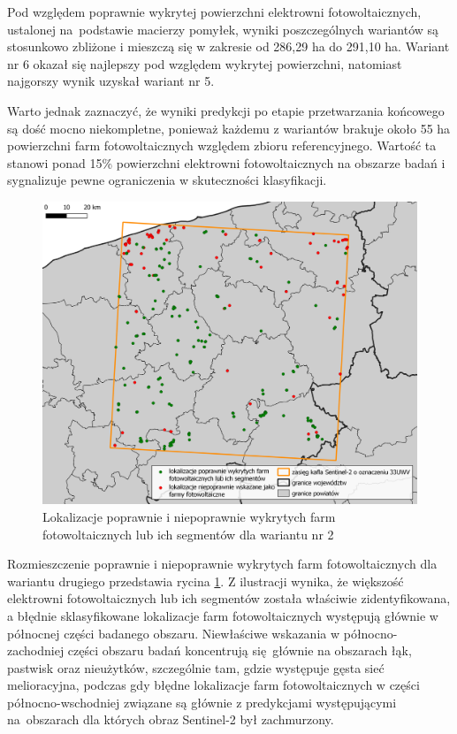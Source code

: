\documentclass{amuthesis}
\begin{document}
Pod względem poprawnie wykrytej powierzchni elektrowni fotowoltaicznych,
ustalonej na~podstawie macierzy pomyłek, wyniki poszczególnych wariantów
są stosunkowo zbliżone i mieszczą się w zakresie od 286,29 ha do 291,10
ha. Wariant nr 6 okazał się najlepszy pod względem wykrytej powierzchni,
natomiast najgorszy wynik uzyskał wariant nr 5.

Warto jednak zaznaczyć, że wyniki predykcji po etapie przetwarzania
końcowego są dość mocno niekompletne, ponieważ każdemu z wariantów
brakuje około 55 ha powierzchni farm fotowoltaicznych względem zbioru
referencyjnego. Wartość ta stanowi ponad 15\% powierzchni elektrowni
fotowoltaicznych na obszarze badań i sygnalizuje pewne ograniczenia w
skuteczności klasyfikacji.

\begin{figure}[t]

{\centering \includegraphics[width=1\textwidth,height=\textheight]{figures/poprawne_niepoprawne_wskazania_dataset2_v2.png}

}

\caption{\label{fig-rycina-classification-results-dataset2}Lokalizacje
poprawnie i niepoprawnie wykrytych farm fotowoltaicznych lub ich
segmentów dla wariantu nr 2}

\end{figure}

Rozmieszczenie poprawnie i niepoprawnie wykrytych farm fotowoltaicznych
dla wariantu drugiego przedstawia rycina
\ref{fig-rycina-classification-results-dataset2}. Z ilustracji wynika,
że większość elektrowni fotowoltaicznych lub ich segmentów została
właściwie zidentyfikowana, a błędnie sklasyfikowane lokalizacje farm
fotowoltaicznych występują głównie w północnej części badanego obszaru.
Niewłaściwe wskazania w północno-zachodniej części obszaru badań
koncentrują się~głównie na obszarach łąk, pastwisk oraz nieużytków,
szczególnie tam, gdzie występuje gęsta sieć melioracyjna, podczas gdy
błędne lokalizacje farm fotowoltaicznych w części północno-wschodniej
związane są głównie z predykcjami występującymi na~obszarach dla których
obraz Sentinel-2 był zachmurzony.
\end{document}
